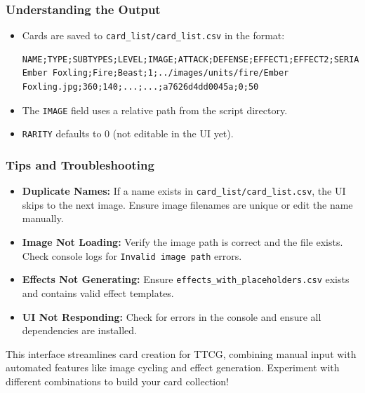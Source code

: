 \subsubsection{Understanding the Output}

\begin{itemize}
    \item Cards are saved to \texttt{card\_list/card\_list.csv} in the format:
\begin{lstlisting}
NAME;TYPE;SUBTYPES;LEVEL;IMAGE;ATTACK;DEFENSE;EFFECT1;EFFECT2;SERIAL;RARITY;TRANSPARENCY
Ember Foxling;Fire;Beast;1;../images/units/fire/Ember Foxling.jpg;360;140;...;...;a7626d4dd0045a;0;50
\end{lstlisting}
    \item The \texttt{IMAGE} field uses a relative path from the script directory.
    \item \texttt{RARITY} defaults to 0 (not editable in the UI yet).
\end{itemize}

\subsubsection{Tips and Troubleshooting}

\begin{itemize}
    \item \textbf{Duplicate Names:} If a name exists in \texttt{card\_list/card\_list.csv}, the UI skips to the next image. Ensure image filenames are unique or edit the name manually.
    \item \textbf{Image Not Loading:} Verify the image path is correct and the file exists. Check console logs for \texttt{Invalid image path} errors.
    \item \textbf{Effects Not Generating:} Ensure \texttt{effects\_with\_placeholders.csv} exists and contains valid effect templates.
    \item \textbf{UI Not Responding:} Check for errors in the console and ensure all dependencies are installed.
\end{itemize}

This interface streamlines card creation for TTCG, combining manual input with automated features like image cycling and effect generation. Experiment with different combinations to build your card collection!
